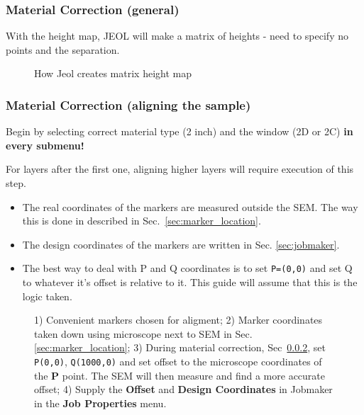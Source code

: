 \subsubsection{Material Correction (general)}
With the height map, JEOL will make a matrix of heights - need to specify no points and the separation.

\begin{figure}[h]
  \centering
  \caption{\small How Jeol creates matrix height map\label{fig:jeol_height_map}}
\end{figure}

\subsubsection{Material Correction (aligning the sample)}\label{sec:material-correction}

Begin by selecting correct material type (2 inch) and the window (2D or 2C) \textbf{in every submenu!}

\begin{framed}\noindent
  For layers after the first one,  aligning higher layers will require execution
  of this step.
  \begin{itemize}
  \item The  real coordinates of the  markers are measured outside  the SEM. The
    way this is done in described in Sec.~\ref{sec:marker_location}.
  \item   The   design    coordinates   of   the   markers    are   written   in
    Sec. \ref{sec:jobmaker}.
  \item The best way to deal with P and Q coordinates is to set \texttt{P=(0,0)}
    and set Q to whatever it's offset  is relative to it. This guide will assume
    that this is the logic taken.
  \end{itemize}
\end{framed}

\begin{figure}[h]
  \centering {}
  \caption{\small  1)   Convenient  markers  chosen  for   aligment;  2)  Marker
    coordinates    taken    down   using    microscope    next    to   SEM    in
    Sec.\ref{sec:marker_location};     3)     During    material     correction,
    Sec~\ref{sec:material-correction},  set \texttt{P(0,0)},  \texttt{Q(1000,0)}
    and set  offset to the microscope  coordinates of the \textbf{P}  point. The
    SEM  will then  measure  and find  a  more accurate  offset;  4) Supply  the
    \textbf{Offset}  and   \textbf{Design  Coordinates}   in  Jobmaker   in  the
    \textbf{Job Properties} menu.}
\end{figure}

